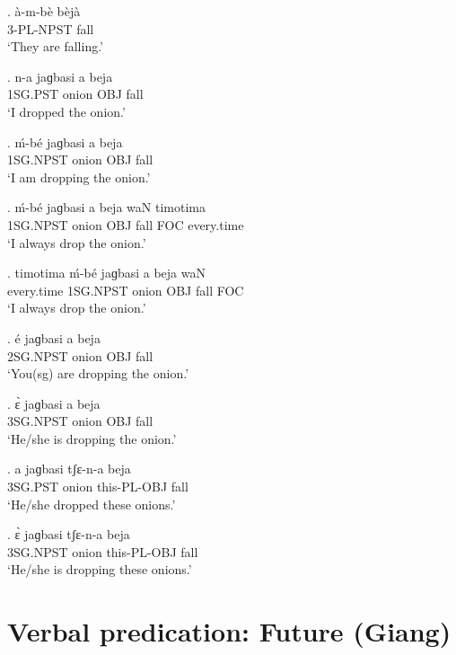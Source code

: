 \documentclass{assets/fieldnotes}
\begin{document}
{\exg.
à-m-bè      bèjà \\
3-PL-NPST   fall \\%
`They are falling.'

\exg.
n-a    jaɡbasi   a     beja \\
1SG.PST   onion     OBJ   fall \\%
`I dropped the onion.'

\exg.
ḿ-bé      jaɡbasi   a     beja \\
1SG.NPST   onion     OBJ   fall \\%
`I am dropping the onion.'

\exg.
ḿ-bé      jaɡbasi   a     beja   waN   timotima   \\
1SG.NPST   onion     OBJ   fall   FOC   every.time \\%
`I always drop the onion.' \label{I always drop the onion}

\exg.
timotima     ḿ-bé       jaɡbasi   a     beja   waN \\
every.time   1SG.NPST   onion     OBJ   fall   FOC \\%
`I always drop the onion.'




\exg.
é         jaɡbasi   a     beja \\
2SG.NPST   onion     OBJ   fall \\%
`You(sg) are dropping the onion.'

\exg.
ɛ̀         jaɡbasi   a     beja \\
3SG.NPST   onion     OBJ   fall \\%
`He/she is dropping the onion.'

\exg.
a     jaɡbasi   tʃɛ-n-a       beja \\
3SG.PST   onion     this-PL-OBJ   fall \\%
`He/she dropped these onions.'

\exg.
ɛ̀         jaɡbasi   tʃɛ-n-a       beja \\
3SG.NPST   onion     this-PL-OBJ   fall \\%
`He/she is dropping these onions.'


\section{Verbal predication: Future (Giang)} %


}
\end{document}
